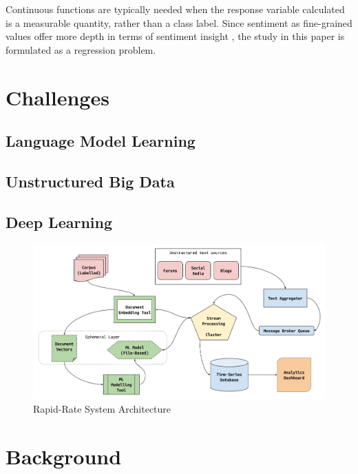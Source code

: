 \documentclass[conference]{IEEEtran}
\begin{document}
        Continuous functions are typically needed when the response variable calculated is a measurable quantity, rather than a class label. Since sentiment as fine-grained values offer more depth in terms of sentiment insight \cite{drake2008sentiment}, the study in this paper is formulated as a regression problem.

\vspace{5mm}

\section{Challenges}

    \subsection{Language Model Learning}
        

    \subsection{Unstructured Big Data}

    \subsection{Deep Learning}

\vspace{5mm}

\begin{figure}[ht] \label{fig:system-architecture}
    \centering
    \includegraphics[width=\textwidth]{images/rapid_rate_system_arch_1.png}
    \caption{Rapid-Rate System Architecture}
\end{figure}

\section{Background}
\end{document}
